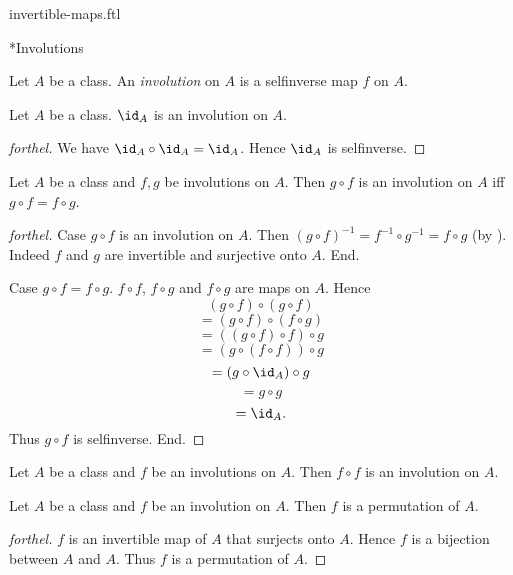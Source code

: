 \documentclass{naproche-library}
\begin{document}
\begin{smodule}[title=Invertible Maps]{invertible-maps.ftl}
\begin{sfragment}*{Involutions}
  \begin{definition}[forthel,id=FOUNDATIONS_09_7282039688527872]
    Let $A$ be a class.
    An \emph{involution} on $A$ is a selfinverse map $f$ on $A$.
  \end{definition}

  \begin{proposition}[forthel,id=FOUNDATIONS_09_7944474185433088]
    Let $A$ be a class.
    $\id_{A}$ is an involution on $A$.
  \end{proposition}
  \begin{proof}[forthel]
    We have $\id_{A} \circ \id_{A} = \id_{A}$.
    Hence $\id_{A}$ is selfinverse.
  \end{proof}

  \begin{proposition}[forthel,id=FOUNDATIONS_09_6897019612299264]
    Let $A$ be a class and $f, g$ be involutions on $A$.
    Then $g \circ f$ is an involution on $A$ iff $g \circ f = f \circ g$.
  \end{proposition}
  \begin{proof}[forthel]
    Case $g \circ f$ is an involution on $A$.
      Then $(g \circ f)^{-1}
        = f^{-1} \circ g^{-1}
        = f \circ g$
      (by ).
      Indeed $f$ and $g$ are invertible and surjective onto $A$.
    End.

    Case $g \circ f = f \circ g$.
      $f \circ f$, $f \circ g$ and $f \circ g$ are maps on $A$.
      Hence
      \[  (g \circ f) \circ (g \circ f)       \]
      \[    = (g \circ f) \circ (f \circ g)   \]
      \[    = ((g \circ f) \circ f) \circ g   \]
      \[    = (g \circ (f \circ f)) \circ g   \]
      \[    = (g \circ \id_{A}) \circ g       \]
      \[    = g \circ g                       \]
      \[    = \id_{A}.                        \]
      Thus $g \circ f$ is selfinverse.
    End.
  \end{proof}

  \begin{corollary}[forthel,id=FOUNDATIONS_09_5958206868160512]
    Let $A$ be a class and $f$ be an involutions on $A$.
    Then $f \circ f$ is an involution on $A$.
  \end{corollary}

  \begin{proposition}[forthel,id=FOUNDATIONS_09_2314262743613440]
    Let $A$ be a class and $f$ be an involution on $A$.
    Then $f$ is a permutation of $A$.
  \end{proposition}
  \begin{proof}[forthel]
    $f$ is an invertible map of $A$ that surjects onto $A$.
    Hence $f$ is a bijection between $A$ and $A$.
    Thus $f$ is a permutation of $A$.
  \end{proof}
\end{sfragment}
\end{smodule}
\end{document}
